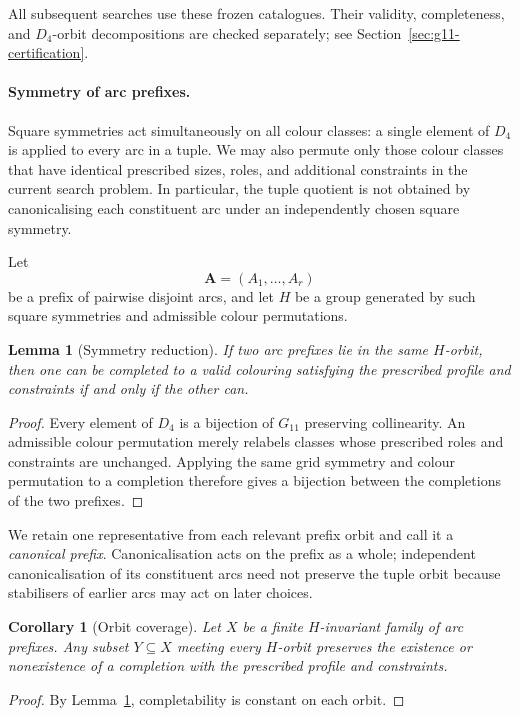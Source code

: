 \documentclass[11pt]{article}
\newtheorem{corollary}[theorem]{Corollary}
\newtheorem{lemma}[theorem]{Lemma}
\theoremstyle{definition}
\theoremstyle{remark}
\newcommand{\Dfour}{D_4}
\begin{document}
All subsequent searches use these frozen catalogues.  Their validity,
completeness, and \(\Dfour\)-orbit decompositions are checked separately;
see Section~\ref{sec:g11-certification}.

\paragraph{Symmetry of arc prefixes.}
Square symmetries act simultaneously on all colour classes: a single element
of \(\Dfour\) is applied to every arc in a tuple.  We may also permute only
those colour classes that have identical prescribed sizes, roles, and
additional constraints in the current search problem.  In particular, the
tuple quotient is not obtained by canonicalising each constituent arc under
an independently chosen square symmetry.

Let
\[
  \mathbf A=(A_1,\ldots,A_r)
\]
be a prefix of pairwise disjoint arcs, and let \(H\) be a group generated by
such square symmetries and admissible colour permutations.

\begin{lemma}[Symmetry reduction]\label{lem:g11-symmetry}
If two arc prefixes lie in the same \(H\)-orbit, then one can be completed to
a valid colouring satisfying the prescribed profile and constraints if and
only if the other can.
\end{lemma}

\begin{proof}
Every element of \(\Dfour\) is a bijection of \(G_{11}\) preserving
collinearity.  An admissible colour permutation merely relabels classes whose
prescribed roles and constraints are unchanged.  Applying the same grid
symmetry and colour permutation to a completion therefore gives a bijection
between the completions of the two prefixes.
\end{proof}

We retain one representative from each relevant prefix orbit and call it
a \emph{canonical prefix}.  Canonicalisation acts on the prefix as a whole;
independent canonicalisation of its constituent arcs need not preserve the
tuple orbit because stabilisers of earlier arcs may act on later choices.

\begin{corollary}[Orbit coverage]
\label{cor:g11-complete-prefix-canonicalisation}
\label{cor:g11-orbit-complete-augmentation}
Let \(X\) be a finite \(H\)-invariant family of arc prefixes.  Any
subset \(Y\subseteq X\) meeting every \(H\)-orbit preserves the existence
or nonexistence of a completion with the prescribed profile and constraints.
\end{corollary}
\begin{proof}
By Lemma~\ref{lem:g11-symmetry}, completability is constant on each orbit.
\end{proof}
\end{document}
